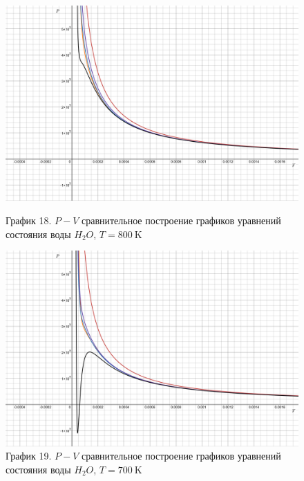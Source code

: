 \documentclass[a4paper]{article}
\numberwithin{equation}{subsection} %
\begin{document}
\begin{figure}[h!]
    \centering
    \begin{minipage}{0.49\textwidth}
        \centering
        \includegraphics[width=\linewidth]{Graphics/H2O/800.png}
        \caption{\label{fig:clausius_1}График 18. $P-V$ сравнительное построение графиков уравнений состояния воды $H_2O$, $T = 800 \ \text{K}$}
    \end{minipage}
    \hfill
    \begin{minipage}{0.49\textwidth}
        \centering
        \includegraphics[width=\linewidth]{Graphics/H2O/700.png}
        \caption{\label{fig:clausius_1}График 19. $P-V$ сравнительное построение графиков уравнений состояния воды $H_2O$, $T = 700 \ \text{K}$}
    \end{minipage}
\end{figure}
\end{document}
